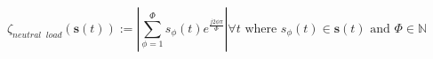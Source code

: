 \begin{equation}
	\zeta_{neutral\;\;load}(\textbf{s}(t)) := \left|\sum_{\phi=1}^{\Phi} s_\phi(t)e^{\frac{j2\phi\pi}{\Phi}}\right| \forall t \text{ where } s_\phi(t) \in \textbf{s}(t) \text{ and } \Phi \in \mathbb{N}
\label{ch1:equ:neutral-load}
\end{equation}